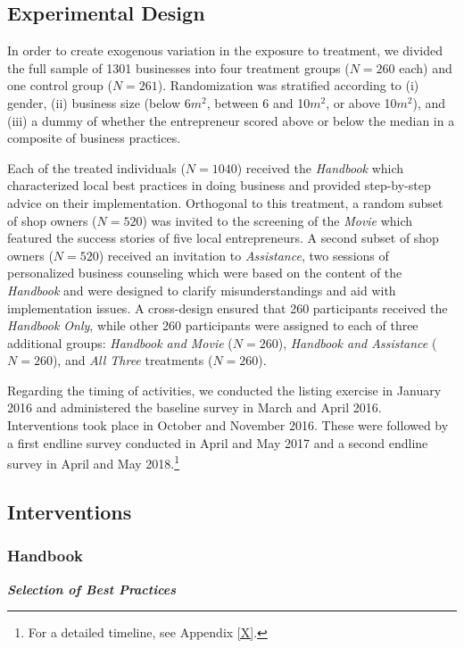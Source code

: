 \documentclass[11.5pt]{article}
\begin{document}
\subsection{Experimental Design}

In order to create exogenous variation in the exposure to treatment, we divided the full sample of 1301 businesses into four treatment groups ($N = 260$ each) and one control group ($N = 261$). Randomization was stratified according to (i) gender, (ii) business size (below 6$m^2$, between 6 and 10$m^2$, or above 10$m^2$), and (iii) a dummy of whether the entrepreneur scored above or below the median in a composite of business practices.

Each of the treated individuals ($N = 1040$) received the \emph{Handbook} which characterized local best practices in doing business and provided step-by-step advice on their implementation. Orthogonal to this treatment, a random subset of shop owners ($N = 520$) was invited to the screening of the \emph{Movie} which featured the success stories of five local entrepreneurs. A second subset of shop owners ($N = 520$) received an invitation to \emph{Assistance}, two sessions of personalized business counseling which were based on the content of the \emph{Handbook} and were designed to clarify misunderstandings and aid with implementation issues. A cross-design ensured that 260 participants received the \emph{Handbook Only}, while other 260 participants were assigned to each of three additional groups: \emph{Handbook and Movie} ($N = 260$), \emph{Handbook and Assistance} ($N = 260$), and \emph{All Three} treatments ($N = 260$).

Regarding the timing of activities, we conducted the listing exercise in January 2016 and administered the baseline survey in March and April 2016. Interventions took place in October and November 2016. These were followed by a first endline survey conducted in April and May 2017 and a second endline survey in April and May 2018.\footnote{For a detailed timeline, see Appendix \ref{X}.}

\subsection{Interventions}

\subsubsection{Handbook}

\emph{\textbf{Selection of Best Practices}}\
\end{document}
